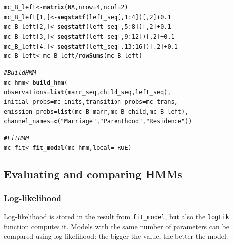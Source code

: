 \documentclass[12pt]{article}\usepackage[]{graphicx}\usepackage[]{color}
\makeatletter
\newcommand{\hlnum}[1]{\textcolor[rgb]{0.686,0.059,0.569}{#1}}%
\newcommand{\hlstr}[1]{\textcolor[rgb]{0.192,0.494,0.8}{#1}}%
\newcommand{\hlcom}[1]{\textcolor[rgb]{0.678,0.584,0.686}{\textit{#1}}}%
\newcommand{\hlopt}[1]{\textcolor[rgb]{0,0,0}{#1}}%
\newcommand{\hlstd}[1]{\textcolor[rgb]{0.345,0.345,0.345}{#1}}%
\newcommand{\hlkwb}[1]{\textcolor[rgb]{0.69,0.353,0.396}{#1}}%
\newcommand{\hlkwc}[1]{\textcolor[rgb]{0.333,0.667,0.333}{#1}}%
\newcommand{\hlkwd}[1]{\textcolor[rgb]{0.737,0.353,0.396}{\textbf{#1}}}%
\newenvironment{kframe}{%
 \def\at@end@of@kframe{}%
 \ifinner\ifhmode%
  \def\at@end@of@kframe{\end{minipage}}%
  \begin{minipage}{\columnwidth}%
 \fi\fi%
 \def\FrameCommand##1{\hskip\@totalleftmargin \hskip-\fboxsep
 \colorbox{shadecolor}{##1}\hskip-\fboxsep
     \hskip-\linewidth \hskip-\@totalleftmargin \hskip\columnwidth}%
 \MakeFramed {\advance\hsize-\width
   \@totalleftmargin\z@ \linewidth\hsize
   \@setminipage}}%
 {\par\unskip\endMakeFramed%
 \at@end@of@kframe}
\newenvironment{knitrout}{}{} %
\makeatother
\begin{document}
\begin{knitrout}
\begin{kframe}
\begin{alltt}
\hlstd{mc_B_left} \hlkwb{<-} \hlkwd{matrix}\hlstd{(}\hlnum{NA}\hlstd{,} \hlkwc{nrow} \hlstd{=} \hlnum{4}\hlstd{,} \hlkwc{ncol} \hlstd{=} \hlnum{2}\hlstd{)}
\hlstd{mc_B_left[}\hlnum{1}\hlstd{,]} \hlkwb{<-} \hlkwd{seqstatf}\hlstd{(left_seq[,} \hlnum{1}\hlopt{:}\hlnum{4}\hlstd{])[,} \hlnum{2}\hlstd{]} \hlopt{+} \hlnum{0.1}
\hlstd{mc_B_left[}\hlnum{2}\hlstd{,]} \hlkwb{<-} \hlkwd{seqstatf}\hlstd{(left_seq[,} \hlnum{5}\hlopt{:}\hlnum{8}\hlstd{])[,} \hlnum{2}\hlstd{]} \hlopt{+} \hlnum{0.1}
\hlstd{mc_B_left[}\hlnum{3}\hlstd{,]} \hlkwb{<-} \hlkwd{seqstatf}\hlstd{(left_seq[,} \hlnum{9}\hlopt{:}\hlnum{12}\hlstd{])[,} \hlnum{2}\hlstd{]} \hlopt{+} \hlnum{0.1}
\hlstd{mc_B_left[}\hlnum{4}\hlstd{,]} \hlkwb{<-} \hlkwd{seqstatf}\hlstd{(left_seq[,} \hlnum{13}\hlopt{:}\hlnum{16}\hlstd{])[,} \hlnum{2}\hlstd{]} \hlopt{+} \hlnum{0.1}
\hlstd{mc_B_left} \hlkwb{<-} \hlstd{mc_B_left} \hlopt{/} \hlkwd{rowSums}\hlstd{(mc_B_left)}

\hlcom{# Build HMM}
\hlstd{mc_hmm} \hlkwb{<-} \hlkwd{build_hmm}\hlstd{(}
  \hlkwc{observations} \hlstd{=} \hlkwd{list}\hlstd{(marr_seq, child_seq, left_seq),}
  \hlkwc{initial_probs} \hlstd{= mc_inits,} \hlkwc{transition_probs} \hlstd{= mc_trans,}
  \hlkwc{emission_probs} \hlstd{=} \hlkwd{list}\hlstd{(mc_B_marr, mc_B_child, mc_B_left),}
  \hlkwc{channel_names} \hlstd{=} \hlkwd{c}\hlstd{(}\hlstr{"Marriage"}\hlstd{,} \hlstr{"Parenthood"}\hlstd{,} \hlstr{"Residence"}\hlstd{))}

\hlcom{# Fit HMM}
\hlstd{mc_fit} \hlkwb{<-} \hlkwd{fit_model}\hlstd{(mc_hmm,} \hlkwc{local} \hlstd{=} \hlnum{TRUE}\hlstd{)}
\end{alltt}
\end{kframe}
\end{knitrout}

\subsection{Evaluating and comparing HMMs}

\subsubsection{Log-likelihood}

Log-likelihood is stored in the result from \texttt{fit\_model}, but also the \texttt{logLik} function computes it. Models with the same number of parameters can be compared using log-likelihood: the bigger the value, the better the model.
\end{document}
